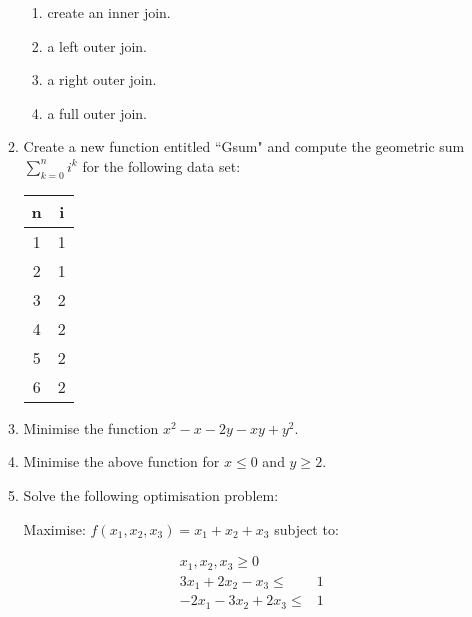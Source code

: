 \documentclass[12pt]{article}
\begin{document}
\begin{enumerate}
\begin{enumerate}
\begin{enumerate}
\item create an inner join.
\item a left outer join.
\item a right outer join.
\item a full outer join.
\end{enumerate}
\item Create a new function entitled ``Gsum" and compute the geometric sum $\sum_{k=0}^ni^k$ for the following data set:
\begin{center}
\begin{tabular}{|c|c|}
\hline
n&i\\\hline\hline
1&1\\\hline
2&1\\\hline
3&2\\\hline
4&2\\\hline
5&2\\\hline
6&2\\
\hline
\end{tabular}
\end{center}
\item Minimise the function $x^2-x-2y-xy+y^2$.
\item Minimise the above function for $x\leq 0$ and $y\geq 2$.
\item Solve the following optimisation problem:
\begin{center}
Maximise: $f(x_1,x_2,x_3)=x_1+x_2+x_3$ subject to:
\end{center}
\begin{align}
x_1,x_2,x_3\geq0\\
3x_1+2x_2-x_3\leq& 1\\
-2x_1-3x_2+2x_3\leq&1
\end{align}
\end{enumerate}
\end{enumerate}
\end{document}

